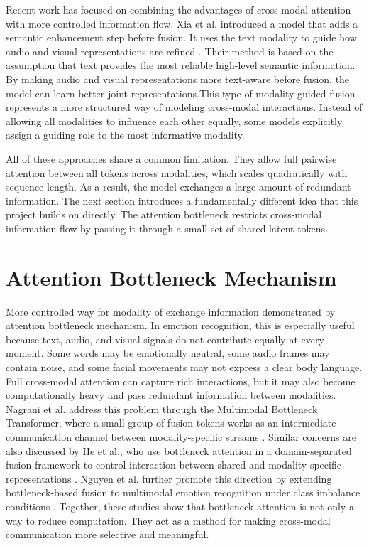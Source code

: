 Recent work has focused on combining the advantages of cross-modal attention with more controlled information flow. Xia et al. introduced a model that adds a semantic enhancement step before fusion. It uses the text modality to guide how audio and visual representations are refined \cite{xia2022multimodal}. Their method is based on the assumption that text provides the most reliable high-level semantic information. By making audio and visual representations more text-aware before fusion, the model can learn better joint representations.This type of modality-guided fusion represents a more structured way of modeling cross-modal interactions. Instead of allowing all modalities to influence each other equally, some models explicitly assign a guiding role to the most informative modality.

All of these approaches share a common limitation. They allow full pairwise attention between all tokens across modalities, which scales quadratically with sequence length. As a result, the model exchanges a large amount of redundant information. The next section introduces a fundamentally different idea that this project builds on directly. The attention bottleneck restricts cross-modal information flow by passing it through a small set of shared latent tokens.


\section{Attention Bottleneck Mechanism}

More controlled way for modality of exchange information demonstrated by attention bottleneck mechanism. In emotion recognition, this is especially useful because text, audio, and visual signals do not contribute equally at every moment. Some words may be emotionally neutral, some audio frames may contain noise, and some facial movements may not express a clear body language. Full cross-modal attention can capture rich interactions, but it may also become computationally heavy and pass redundant information between modalities. Nagrani et al. address this problem through the Multimodal Bottleneck Transformer, where a small group of fusion tokens works as an intermediate communication channel between modality-specific streams \cite{nagrani2021attention}. Similar concerns are also discussed by He et al., who use bottleneck attention in a domain-separated fusion framework to control interaction between shared and modality-specific representations \cite{he2024domain}. Nguyen et al. further promote this direction by extending bottleneck-based fusion to multimodal emotion recognition under class imbalance conditions \cite{nguyen2025enhanced}. Together, these studies show that bottleneck attention is not only a way to reduce computation. They act as a method for making cross-modal communication more selective and meaningful.

